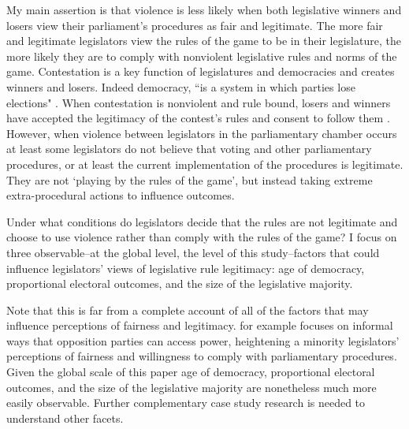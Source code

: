 \documentclass[a4paper]{article}\usepackage{graphicx, color}
\begin{document}
My main assertion is that violence is less likely when both legislative winners and losers view their parliament's procedures as fair and legitimate. The more fair and legitimate legislators view the rules of the game to be in their legislature, the more likely they are to comply with nonviolent legislative rules and norms of the game. Contestation is a key function of legislatures and democracies \citep{Alvarez1996, Dahl1971, Follesdal2006} and creates winners and losers. Indeed democracy, ``is a system in which parties lose elections" \citep[][10]{Przeworski1991}.  When contestation is nonviolent and rule bound, losers and winners have accepted the legitimacy of the contest's rules \citep[][553]{Nadeau1993} and consent to follow them \citep[c.f.][]{Anderson2005}. However, when violence between legislators in the parliamentary chamber occurs at least some legislators do not believe that voting and other parliamentary procedures, or at least the current implementation of the procedures is legitimate. They are not `playing by the rules of the game', but instead taking extreme extra-procedural actions to influence outcomes.

Under what conditions do legislators decide that the rules are not legitimate and choose to use violence rather than comply with the rules of the game? I focus on three observable--at the global level, the level of this study--factors that could influence legislators' views of legislative rule legitimacy: age of democracy, proportional electoral outcomes, and the size of the legislative majority. 

Note that this is far from a complete account of all of the factors that may influence perceptions of fairness and legitimacy. \cite{Wolfe2004} for example focuses on informal ways that opposition parties can access power, heightening a minority legislators' perceptions of fairness and willingness to comply with parliamentary procedures. Given the global scale of this paper age of democracy, proportional electoral outcomes, and the size of the legislative majority are nonetheless much more easily observable. Further complementary case study research is needed to understand other facets.
\end{document}
